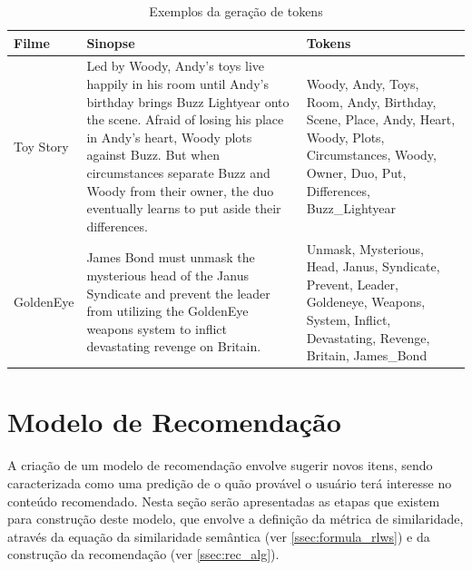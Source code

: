 \begin{table}[H]
	\centering
	\caption{Exemplos da geração de tokens}
	\def\arraystretch{1.3} %
	\begin{tabular}{|p{2cm}|p{6cm}|p{6cm}|}
	\hline
	\textbf{Filme} & \textbf{Sinopse} & \textbf{Tokens} \\ \hline
	Toy Story & Led by Woody, Andy's toys live happily in his room until Andy's birthday brings Buzz Lightyear onto the scene. Afraid of losing his place in Andy's heart, Woody plots against Buzz. But when circumstances separate Buzz and Woody from their owner, the duo eventually learns to put aside their differences.& Woody, Andy, Toys, Room, Andy, Birthday, Scene, Place, Andy, Heart, Woody, Plots, Circumstances, Woody, Owner, Duo, Put, Differences, Buzz\_Lightyear \\ \hline
	GoldenEye & James Bond must unmask the mysterious head of the Janus Syndicate and prevent the leader from utilizing the GoldenEye weapons system to inflict devastating revenge on Britain. & Unmask, Mysterious, Head, Janus, Syndicate, Prevent, Leader, Goldeneye, Weapons, System, Inflict, Devastating, Revenge, Britain, James\_Bond \\ \hline
	\end{tabular}
\label{tab:nlp_example}
\end{table}

\section{Modelo de Recomendação}
\label{ssec:sim_rec}

A criação de um modelo de recomendação envolve sugerir novos itens, sendo caracterizada como uma predição de o quão provável o usuário terá interesse no conteúdo recomendado. Nesta seção serão apresentadas as etapas que existem para construção deste modelo, que envolve a definição da métrica de similaridade, através da equação da similaridade semântica (ver \ref{ssec:formula_rlws}) e da construção da recomendação (ver \ref{ssec:rec_alg}).

